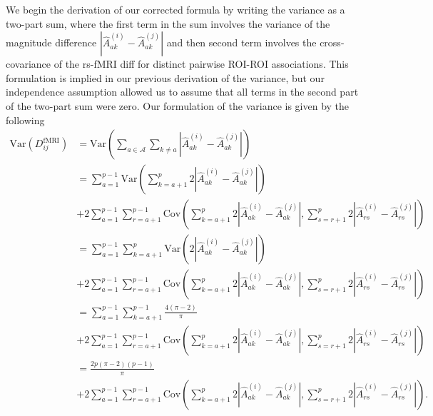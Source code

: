 \documentclass[aos]{imsart}
\begin{document}
We begin the derivation of our corrected formula by writing the variance as a two-part sum, where the first term in the sum involves the variance of the magnitude difference $|\hat{A}^{(i)}_{ak} - \hat{A}^{(j)}_{ak}|$ and then second term involves the cross-covariance of the rs-fMRI diff for distinct pairwise ROI-ROI associations. This formulation is implied in our previous derivation of the variance, but our independence assumption allowed us to assume that all terms in the second part of the two-part sum were zero. Our formulation of the variance is given by the following
%
\begin{equation}\label{eq:var_DDistr_rs-fMRI}
\begin{aligned}
\text{Var}(D^\text{fMRI}_{ij}) &= \text{Var}\left(\sum_{a \in \mathcal{A}} \sum_{k \neq a} \left|\hat{A}^{(i)}_{ak} - \hat{A}^{(j)}_{ak}\right|\right) \\
&= \sum_{a = 1}^{p-1} \text{Var}\left(\sum_{k=a+1}^{p} 2\left|\hat{A}^{(i)}_{ak} - \hat{A}^{(j)}_{ak}\right|\right) \\
&+ 2\sum_{a = 1}^{p-1} \sum_{r=a+1}^{p-1} \text{Cov}\left(\sum_{k=a+1}^{p} 2\left|\hat{A}^{(i)}_{ak} - \hat{A}^{(j)}_{ak}\right|, \sum_{s=r+1}^{p} 2\left|\hat{A}^{(i)}_{rs} - \hat{A}^{(j)}_{rs}\right|\right) \\
&= \sum_{a=1}^{p-1} \sum_{k=a+1}^{p} \text{Var}\left(2\left|\hat{A}^{(i)}_{ak} - \hat{A}^{(j)}_{ak}\right|\right) \\
&+ 2\sum_{a = 1}^{p-1} \sum_{r=a+1}^{p-1} \text{Cov}\left(\sum_{k=a+1}^{p} 2\left|\hat{A}^{(i)}_{ak} - \hat{A}^{(j)}_{ak}\right|, \sum_{s=r+1}^{p} 2\left|\hat{A}^{(i)}_{rs} - \hat{A}^{(j)}_{rs}\right|\right) \\
&= \sum_{a = 1}^{p-1} \sum_{k=a+1}^{p-1}\frac{4(\pi-2)}{\pi} \\
&+ 2\sum_{a = 1}^{p-1} \sum_{r=a+1}^{p-1} \text{Cov}\left(\sum_{k=a+1}^{p} 2\left|\hat{A}^{(i)}_{ak} - \hat{A}^{(j)}_{ak}\right|, \sum_{s=r+1}^{p} 2\left|\hat{A}^{(i)}_{rs} - \hat{A}^{(j)}_{rs}\right|\right) \\
&= \frac{2p(\pi-2)(p-1)}{\pi} \\
&+ 2\sum_{a = 1}^{p-1} \sum_{r=a+1}^{p-1} \text{Cov}\left(\sum_{k=a+1}^{p} 2\left|\hat{A}^{(i)}_{ak} - \hat{A}^{(j)}_{ak}\right|, \sum_{s=r+1}^{p} 2\left|\hat{A}^{(i)}_{rs} - \hat{A}^{(j)}_{rs}\right|\right).
\end{aligned}
\end{equation}
\end{document}
